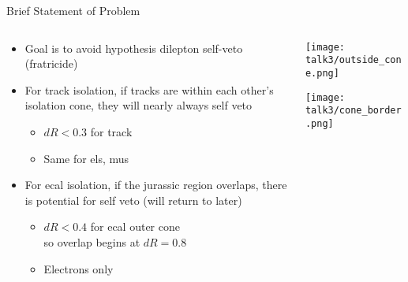 \documentclass{beamer}
\begin{document}
\begin{frame}{Brief Statement of Problem}
  \begin{columns}
    \begin{column}{5.5cm}
      
      \begin{itemize}
      \item Goal is to avoid hypothesis dilepton self-veto (fratricide)
      \item For track isolation, if tracks are within each other's isolation cone, they will nearly always self veto
        \begin{itemize}
        \item $dR < 0.3$ for track
        \item Same for els, mus
        \end{itemize}
      \item For ecal isolation, if the jurassic region overlaps, there is potential for self veto (will return to later)
        \begin{itemize}
        \item $dR < 0.4$ {\small{for ecal outer cone}}\\ so overlap begins at $dR = 0.8$
        \item Electrons only
        \end{itemize}
      \end{itemize}
      
    \end{column}
    
    \begin{column}{7cm}
      \texttt{[image: talk3/outside\_cone.png]}

      \texttt{[image: talk3/cone\_border.png]}
    \end{column}
  \end{columns}
\end{frame}
\end{document}
